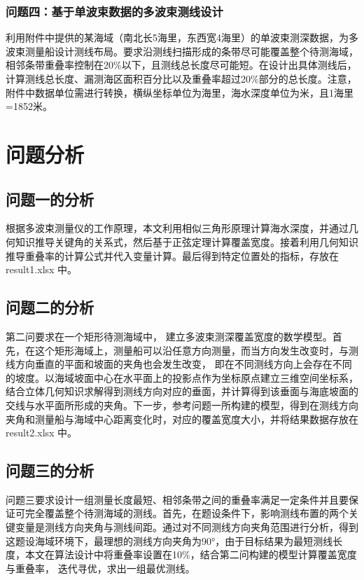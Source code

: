 \documentclass{cumcmthesis}
\begin{document}
\subsubsection{问题四：基于单波束数据的多波束测线设计}

利用附件中提供的某海域（南北长5海里，东西宽4海里）的单波束测深数据，为多波束测量船设计测线布局。要求沿测线扫描形成的条带尽可能覆盖整个待测海域，相邻条带重叠率控制在20\%以下，且测线总长度尽可能短。在设计出具体测线后，计算测线总长度、漏测海区面积百分比以及重叠率超过20\%部分的总长度。注意，附件中数据单位需进行转换，横纵坐标单位为海里，海水深度单位为米，且1海里=1852米。

\section{问题分析}

\subsection{问题一的分析}

根据多波束测量仪的工作原理，本文利用相似三角形原理计算海水深度，并通过几何知识推导关键角的关系式，然后基于正弦定理计算覆盖宽度。接着利用几何知识推导重叠率的计算公式并代入变量计算。最后得到特定位置处的指标，存放在 result1.xlsx 中。

\subsection{问题二的分析}

第二问要求在一个矩形待测海域中， 建立多波束测深覆盖宽度的数学模型。首先，在这个矩形海域上，测量船可以沿任意方向测量，而当方向发生改变时，与测线方向垂直的平面和坡面的夹角也会发生改变， 即在不同测线方向上会存在不同的坡度。以海域坡面中心在水平面上的投影点作为坐标原点建立三维空间坐标系，结合立体几何知识求解得到测线方向对应的垂面，并计算得到该垂面与海底坡面的交线与水平面所形成的夹角。下一步，参考问题一所构建的模型，得到在测线方向夹角和测量船与海域中心距离变化时，对应的覆盖宽度大小，并将结果数据存放在 result2.xlsx 中。

\subsection{问题三的分析}

问题三要求设计一组测量长度最短、相邻条带之间的重叠率满足一定条件并且要保证可完全覆盖整个待测海域的测线。首先，在题设条件下，影响测线布置的两个关键变量是测线方向夹角与测线间距。通过对不同测线方向夹角范围进行分析，得到这题设海域环境下，最理想的测线方向夹角为90°，由于目标结果为最短测线长度，本文在算法设计中将重叠率设置在10\%，结合第二问构建的模型计算覆盖宽度与重叠率， 迭代寻优，求出一组最优测线。
\end{document}

